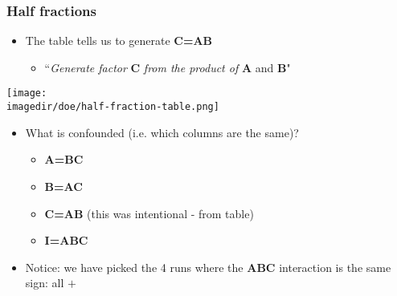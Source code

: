 \begin{frame}\frametitle{Half fractions}
	\begin{itemize}
		\item	The table tells us to generate \textbf{C=AB}
		\begin{itemize}
			\item	``\emph{Generate factor} \textbf{C} \emph{from the product of} \textbf{A} and \textbf{B}"
		\end{itemize}
	\end{itemize}
	\begin{center}
		\texttt{[image: \\imagedir/doe/half-fraction-table.png]}
	\end{center}
	\begin{itemize}
		\item	What is confounded (i.e. which columns are the same)?
		\begin{itemize}
			\item	\textbf{A=BC}
			\item	\textbf{B=AC}
			\item	\textbf{C=AB} (this was intentional - from table)
			\item	\textbf{I=ABC}
		\end{itemize}
	\end{itemize}
	\begin{itemize}
		\item	Notice: we have picked the 4 runs where the \textbf{ABC} interaction is the same sign: all $+$
	\end{itemize}
\end{frame}

